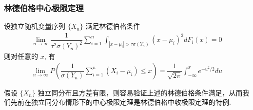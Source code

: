 \begin{frame}
	\frametitle{林德伯格中心极限定理}
	\begin{thm}
		设独立随机变量序列 $\{X_n\}$ 满足林德伯格条件
		\begin{eqnarray}\label{eq:Lindeberg}
			\lim_{n\rightarrow\infty} \dfrac{1}{\tau^2\sigma(Y_n)^2}\sum_{i=1}^n\int_{|x-\mu_i|>\tau\sigma(Y_n)}(x-\mu_i)^2dF_i(x)=0
		\end{eqnarray} 则对任意的 $x$, 有
		\begin{eqnarray*}
			\lim_{n\rightarrow\infty}P(\dfrac{1}{\sigma(Y_n)}\sum_{i=1}^n(X_i-\mu_i)\le x)=\dfrac{1}{\sqrt{2\pi}}\int_{-\infty}^xe^{-u^2/2}du
		\end{eqnarray*}
	\end{thm}
	\pause
	\begin{rmk}
		假设 $\{X_n\}$ 独立同分布且方差有限，则容易验证上述的林德伯格条件满足，从而我们先前在独立同分布情形下的中心极限定理是林德伯格中收极限定理的特例.
	\end{rmk}
\end{frame}

